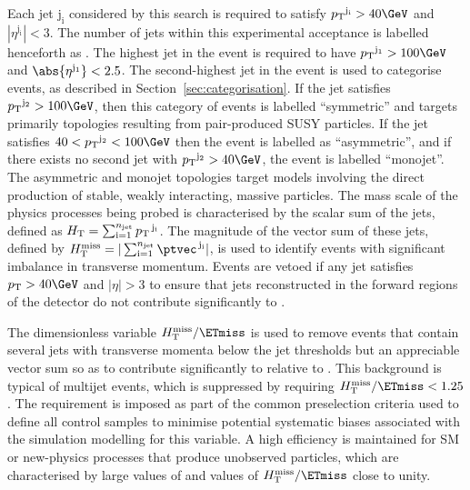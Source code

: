 Each jet $\mathrm{j_i}$ considered by this search is required to satisfy
$\Pt^{\mathrm{j_i}} > 40\GeV$ and $|\eta^{\mathrm{j_i}}| < 3$. The number
of jets within this experimental acceptance is labelled henceforth as
\njet. The highest \Pt jet in the event is required to have
$\Pt^{\mathrm{j_1}} > 100\GeV$ and $\abs{\eta^{\mathrm{j_1}}} < 2.5$. The
second-highest \Pt jet in the event is used to categorise events, as
described in Section~\ref{sec:categorisation}. If the jet satisfies
$\Pt^{\mathrm{j_2}} > 100\GeV$, then this category of events is labelled
``symmetric'' and targets primarily topologies resulting from
pair-produced SUSY particles. 
If the jet satisfies $40 < \Pt^{\mathrm{j_2}} < 100\GeV$ then the event
is labelled as ``asymmetric'', and if there exists no second jet with
$\Pt^{\mathrm{j_2}} > 40\GeV$, the event is labelled ``monojet''. The
asymmetric and monojet topologies target models involving the direct
production of stable, weakly interacting, massive particles. 
The mass scale of the physics processes being probed is characterised
by the scalar \Pt sum of the jets, defined as $H_{\mathrm{T}} =
\sum_{\textrm{i}=1}^{n_{\text{jet}}} {p_{\text T}}^{\,\mathrm{j_i}}$. 
The magnitude of the vector \ptvec sum of these jets, defined by
$\HTmiss = |\sum_{\textrm{i}=1}^{\njet} \ptvec^{\,\mathrm{j_i}}|$, is
used to identify events with significant imbalance in transverse
momentum. Events are vetoed if any jet satisfies $\Pt > 40\GeV$ and
$|\eta| > 3$ to ensure that jets reconstructed in the forward regions
of the detector do not contribute significantly to \HTmiss.

The dimensionless variable $\HTmiss / \ETmiss$ is used to remove
events that contain several jets with transverse momenta below the jet
\Pt thresholds but an appreciable vector \Pt sum so as to contribute
significantly to \HTmiss relative to \ETmiss. This background is
typical of multijet events, which is suppressed by requiring $\HTmiss
/ \ETmiss < 1.25$. The requirement is imposed as part of the common
preselection criteria used to define all control samples to minimise
potential systematic biases associated with the simulation modelling
for this variable. A high efficiency is maintained for SM or
new-physics processes that produce unobserved particles, which are
characterised by large values of \ptvecmiss and values of $\HTmiss /
\ETmiss$ close to unity.

